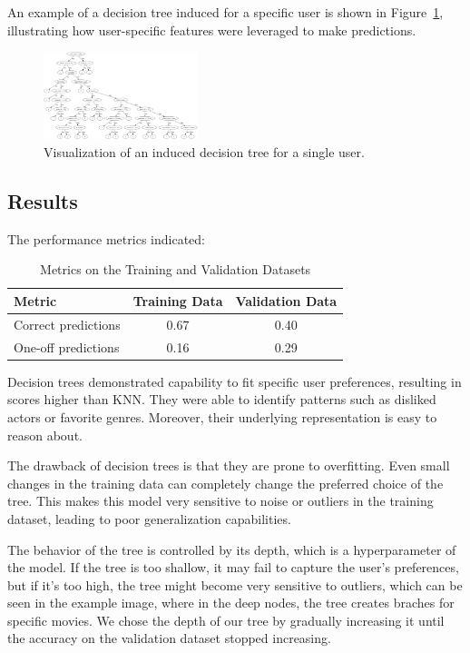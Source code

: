 \documentclass[a4paper,9pt]{article}
\begin{document}
An example of a decision tree induced for a specific user is shown in Figure~\ref{fig:decision_tree}, illustrating how user-specific features were leveraged to make predictions.

\begin{figure}[h!]
	\centering
	\includegraphics[width=0.4\textwidth]{tree}
	\caption{Visualization of an induced decision tree for a single user.}
	\label{fig:decision_tree}
\end{figure}

\subsection{Results}
The performance metrics indicated:

\begin{table}[ht]
	\centering
	\begin{tabular}{|l|c|c|}
		\hline
		\textbf{Metric}     & \textbf{Training Data} & \textbf{Validation Data} \\ \hline
		Correct predictions & 0.67                   & 0.40                     \\ \hline
		One-off predictions & 0.16                   & 0.29                     \\ \hline
	\end{tabular}
	\caption{Metrics on the Training and Validation Datasets}
	\label{tab:decision_tree_results}
\end{table}

Decision trees demonstrated capability to fit specific user preferences, resulting in scores higher than KNN.
They were able to identify patterns such as disliked actors or favorite genres. Moreover, their underlying representation is easy to reason about.

The drawback of decision trees is that they are prone to overfitting. Even small changes in the training data can completely change the preferred choice of the tree. This makes this model very sensitive to noise or outliers in the training dataset, leading to poor generalization capabilities.

The behavior of the tree is controlled by its depth, which is a hyperparameter of the model.
If the tree is too shallow, it may fail to capture the user's preferences, but if it's too high, the tree might become very sensitive to outliers, which can be seen in the example image, where in the deep nodes, the tree creates braches for specific movies. We chose the depth of our tree by gradually increasing it until the accuracy on the validation dataset stopped increasing.
\end{document}
